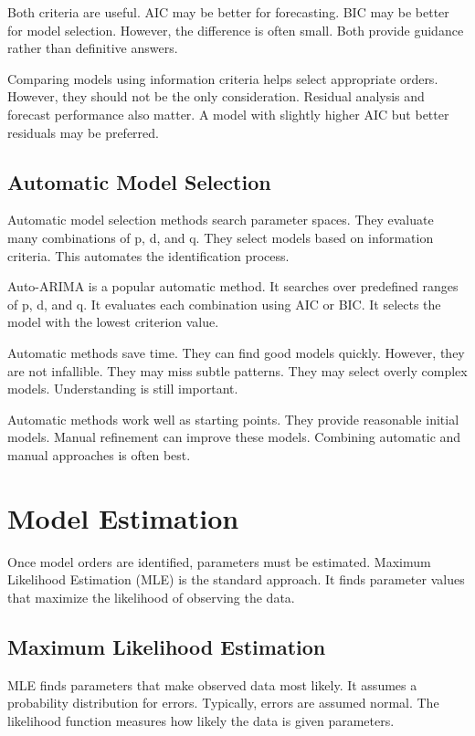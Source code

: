Both criteria are useful. AIC may be better for forecasting. BIC may be better for model selection. However, the difference is often small. Both provide guidance rather than definitive answers.

Comparing models using information criteria helps select appropriate orders. However, they should not be the only consideration. Residual analysis and forecast performance also matter. A model with slightly higher AIC but better residuals may be preferred.

\subsection{Automatic Model Selection}

Automatic model selection methods search parameter spaces. They evaluate many combinations of p, d, and q. They select models based on information criteria. This automates the identification process.

Auto-ARIMA is a popular automatic method. It searches over predefined ranges of p, d, and q. It evaluates each combination using AIC or BIC. It selects the model with the lowest criterion value.

Automatic methods save time. They can find good models quickly. However, they are not infallible. They may miss subtle patterns. They may select overly complex models. Understanding is still important.

Automatic methods work well as starting points. They provide reasonable initial models. Manual refinement can improve these models. Combining automatic and manual approaches is often best.

\section{Model Estimation}

Once model orders are identified, parameters must be estimated. Maximum Likelihood Estimation (MLE) is the standard approach. It finds parameter values that maximize the likelihood of observing the data.

\subsection{Maximum Likelihood Estimation}

MLE finds parameters that make observed data most likely. It assumes a probability distribution for errors. Typically, errors are assumed normal. The likelihood function measures how likely the data is given parameters.

